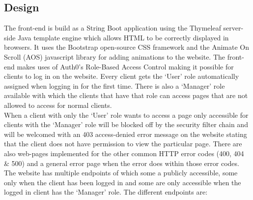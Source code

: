 \documentclass[10pt,a4paper,kul]{kulakarticle} %
\begin{document}
	\subsection{Design}
	The front-end is build as a String Boot application using the Thymeleaf server-side Java template engine which allows HTML to be correctly displayed in browsers. It uses the Bootstrap open-source CSS framework and the Animate On Scroll (AOS) javascript library for adding animations to the website. The front-end makes uses of Auth0's Role-Based Access Control making it possible for clients to log in on the website. Every client gets the `User' role automatically assigned when logging in for the first time. There is also a `Manager' role available with which the clients that have that role can access pages that are not allowed to access for normal clients.\\
	\newline
	When a client with only the `User' role wants to access a page only accessible for clients with the `Manager' role will be blocked off by the security filter chain and will be welcomed with an 403 access-denied error message on the website stating that the client does not have permission to view the particular page. There are also web-pages implemented for the other common HTTP error codes (400, 404 \& 500) and a general error page when the error does within those error codes. The website has multiple endpoints of which some a publicly accessible, some only when the client has been logged in and some are only accessible when the logged in client has the `Manager' role. The different endpoints are:
	
\end{document}
